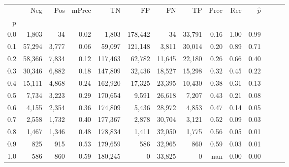 \begin{tabular}{rrrrrrrrrrrrrr}
\toprule
{} &     Neg &    Pos & mPrec &       TN &       FP &      FN &      TP &  Prec &   Rec & $\hat{p}$ \\
p   &         &        &       &          &          &         &         &       &       &           \\
\midrule
0.0 &   1,803 &     34 &  0.02 &    1,803 &  178,442 &      34 &  33,791 &  0.16 &  1.00 &      0.99 \\
0.1 &  57,294 &  3,777 &  0.06 &   59,097 &  121,148 &   3,811 &  30,014 &  0.20 &  0.89 &      0.71 \\
0.2 &  58,366 &  7,834 &  0.12 &  117,463 &   62,782 &  11,645 &  22,180 &  0.26 &  0.66 &      0.40 \\
0.3 &  30,346 &  6,882 &  0.18 &  147,809 &   32,436 &  18,527 &  15,298 &  0.32 &  0.45 &      0.22 \\
0.4 &  15,111 &  4,868 &  0.24 &  162,920 &   17,325 &  23,395 &  10,430 &  0.38 &  0.31 &      0.13 \\
0.5 &   7,734 &  3,223 &  0.29 &  170,654 &    9,591 &  26,618 &   7,207 &  0.43 &  0.21 &      0.08 \\
0.6 &   4,155 &  2,354 &  0.36 &  174,809 &    5,436 &  28,972 &   4,853 &  0.47 &  0.14 &      0.05 \\
0.7 &   2,558 &  1,732 &  0.40 &  177,367 &    2,878 &  30,704 &   3,121 &  0.52 &  0.09 &      0.03 \\
0.8 &   1,467 &  1,346 &  0.48 &  178,834 &    1,411 &  32,050 &   1,775 &  0.56 &  0.05 &      0.01 \\
0.9 &     825 &    915 &  0.53 &  179,659 &      586 &  32,965 &     860 &  0.59 &  0.03 &      0.01 \\
1.0 &     586 &    860 &  0.59 &  180,245 &        0 &  33,825 &       0 &   nan &  0.00 &      0.00 \\
\bottomrule
\end{tabular}

